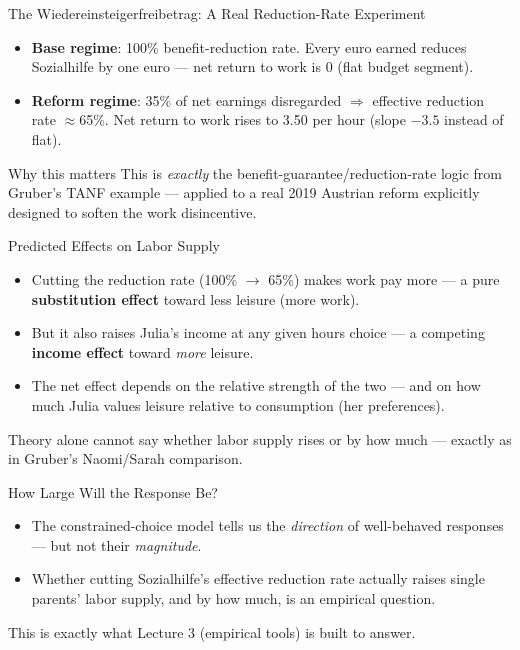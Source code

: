 \documentclass[11pt,aspectratio=169]{beamer}
\begin{document}
\begin{frame}{The Wiedereinsteigerfreibetrag: A Real Reduction-Rate Experiment}
  \begin{itemize}
    \item \textbf{Base regime}: 100\% benefit-reduction rate. Every euro earned reduces Sozialhilfe by one euro --- net return to work is \texteuro{}0 (flat budget segment).
    \item \textbf{Reform regime}: 35\% of net earnings disregarded $\Rightarrow$ effective reduction rate \(\approx\)65\%. Net return to work rises to \texteuro{}3.50 per hour (slope $-3.5$ instead of flat).
  \end{itemize}
  \begin{alertblock}{Why this matters}
    This is \emph{exactly} the benefit-guarantee/reduction-rate logic from Gruber's TANF example --- applied to a real 2019 Austrian reform explicitly designed to soften the work disincentive.
  \end{alertblock}
\end{frame}

\begin{frame}{Predicted Effects on Labor Supply}
  \begin{itemize}
    \item Cutting the reduction rate (100\% $\to$ 65\%) makes work pay more --- a pure \textbf{substitution effect} toward less leisure (more work).
    \item But it also raises Julia's income at any given hours choice --- a competing \textbf{income effect} toward \emph{more} leisure.
    \item The net effect depends on the relative strength of the two --- and on how much Julia values leisure relative to consumption (her preferences).
  \end{itemize}
  \vspace{0.3em}
  \centering
  \alert{Theory alone cannot say whether labor supply rises or by how much --- exactly as in Gruber's Naomi/Sarah comparison.}
\end{frame}

\begin{frame}{How Large Will the Response Be?}
  \begin{itemize}
    \item The constrained-choice model tells us the \emph{direction} of well-behaved responses --- but not their \emph{magnitude}.
    \item Whether cutting Sozialhilfe's effective reduction rate actually raises single parents' labor supply, and by how much, is an empirical question.
  \end{itemize}
  \centering
  \alert{This is exactly what Lecture 3 (empirical tools) is built to answer.}
\end{frame}
\end{document}
